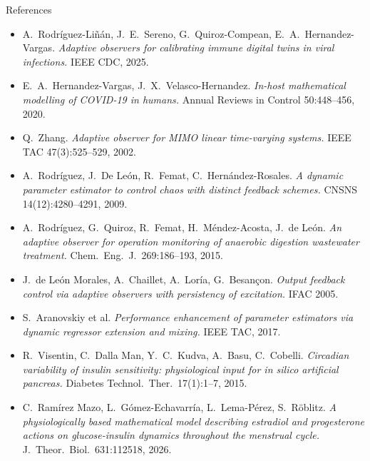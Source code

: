 \documentclass[aspectratio=169,11pt]{beamer}
\begin{document}
\begin{frame}{References}
\scriptsize
\begin{itemize}
  \setlength\itemsep{0.15em}
  \item A.~Rodríguez-Liñán, J.~E.~Sereno, G.~Quiroz-Compean, E.~A.~Hernandez-Vargas. \emph{Adaptive observers for calibrating immune digital twins in viral infections.} IEEE CDC, 2025.
  \item E.~A.~Hernandez-Vargas, J.~X.~Velasco-Hernandez. \emph{In-host mathematical modelling of COVID-19 in humans.} Annual Reviews in Control 50:448--456, 2020.
  \item Q.~Zhang. \emph{Adaptive observer for MIMO linear time-varying systems.} IEEE TAC 47(3):525--529, 2002.
  \item A.~Rodríguez, J.~De León, R.~Femat, C.~Hernández-Rosales. \emph{A dynamic parameter estimator to control chaos with distinct feedback schemes.} CNSNS 14(12):4280--4291, 2009.
  \item A.~Rodríguez, G.~Quiroz, R.~Femat, H.~Méndez-Acosta, J.~de León. \emph{An adaptive observer for operation monitoring of anaerobic digestion wastewater treatment.} Chem.\ Eng.\ J.\ 269:186--193, 2015.
  \item J.~de León Morales, A.~Chaillet, A.~Loría, G.~Besançon. \emph{Output feedback control via adaptive observers with persistency of excitation.} IFAC 2005.
  \item S.~Aranovskiy et al. \emph{Performance enhancement of parameter estimators via dynamic regressor extension and mixing.} IEEE TAC, 2017.
  \item R.~Visentin, C.~Dalla Man, Y.~C.~Kudva, A.~Basu, C.~Cobelli. \emph{Circadian variability of insulin sensitivity: physiological input for in silico artificial pancreas.} Diabetes Technol.\ Ther.\ 17(1):1--7, 2015.
  \item C.~Ramírez Mazo, L.~Gómez-Echavarría, L.~Lema-Pérez, S.~Röblitz. \emph{A physiologically based mathematical model describing estradiol and progesterone actions on glucose-insulin dynamics throughout the menstrual cycle.} J.\ Theor.\ Biol.\ 631:112518, 2026.
\end{itemize}
\end{frame}
\end{document}
